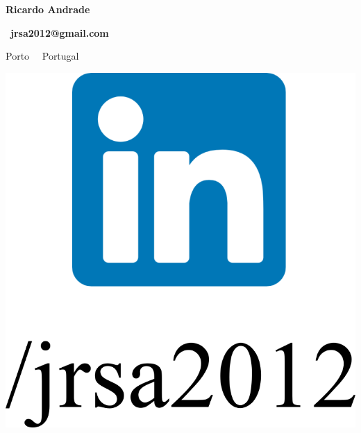 \documentclass{mycv}
\begin{document}
\begin{center}
	{\LARGE\textbf{Ricardo Andrade}} \\
	\vspace{0.2cm}	
	
	\ \textbf{jrsa2012@gmail.com}
	
	
	\vspace{0.2cm}	
	
		Porto~\textbullet 
	\ Portugal

\end{center}

\begin{center}
	
	\href{https://www.linkedin.com/in/jrsa2012}{\includegraphics[scale=0.06]{figs/linkedin_logo_label.png}}
	\ \ \ \ \ \ \ \ \ \ \

\end{center}
\end{document}
